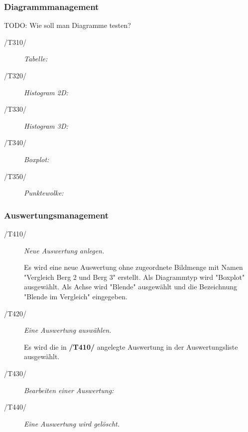 	\subsubsection{Diagrammmanagement}

		TODO: Wie soll man Diagramme testen?	
	
		\begin{description}
			
			\item[/T310/] \textit{Tabelle:}\par 

			\item[/T320/] \textit{Histogram 2D:}\par 
		
			\item[/T330/] \textit{Histogram 3D:}\par 

			\item[/T340/] \textit{Boxplot:}\par 

			\item[/T350/] \textit{Punktewolke:}\par 

		\end{description}
	
	\subsubsection{Auswertungsmanagement}

		\begin{description}
		
			\item[/T410/] \textit{Neue Auswertung anlegen.}\par Es wird eine neue Auswertung ohne zugeordnete Bildmenge mit Namen "Vergleich Berg 2 und Berg 3" erstellt. Als Diagrammtyp wird "Boxplot" ausgewählt. Als Achse wird "Blende" ausgewählt und die Bezeichnung "Blende im Vergleich" eingegeben.
			
			\item[/T420/] \textit{Eine Auswertung auswählen.}\par Es wird die in \textbf{/T410/} angelegte Auswertung in der Auswertungsliste ausgewählt.
			
			\item[/T430/] \textit{Bearbeiten einer Auswertung:}\par 
				
			\item[/T440/] \textit{Eine Auswertung wird gelöscht.}\par
							
		\end{description}
	
